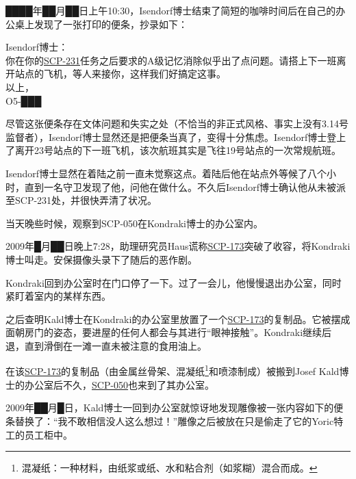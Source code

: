 

████年██月██日上午10:30，Isendorf博士结束了简短的咖啡时间后在自己的办公桌上发现了一张打印的便条，抄录如下：

\begin{scpbox}

Isendorf博士：\\
你在你的\hyperref[chap:SCP-231]{SCP-231}任务之后要求的A级记忆消除似乎出了点问题。请搭上下一班离开站点的飞机，等人来接你，这样我们好搞定这事。\\
以上，\\
O5-███

\end{scpbox}

尽管这张便条存在文体问题和失实之处（不恰当的非正式风格、事实上没有3.14号监督者），Isendorf博士显然还是把便条当真了，变得十分焦虑。Isendorf博士登上了离开23号站点的下一班飞机，该次航班其实是飞往19号站点的一次常规航班。

Isendorf博士显然在着陆之前一直未觉察这点。着陆后他在站点外等候了八个小时，直到一名守卫发现了他，问他在做什么。不久后Isendorf博士确认他从未被派至SCP-231处，并很快弄清了状况。

当天晚些时候，观察到SCP-050在Kondraki博士的办公室内。



2009年█月██日晚上7:28，助理研究员Haus谎称\hyperref[chap:SCP-173]{SCP-173}突破了收容，将Kondraki博士叫走。安保摄像头录下了随后的恶作剧。

Kondraki回到办公室时在门口停了一下。过了一会儿，他慢慢退出办公室，同时紧盯着室内的某样东西。

之后查明Kald博士在Kondraki的办公室里放置了一个\hyperref[chap:SCP-173]{SCP-173}的复制品。它被摆成面朝房门的姿态，要进屋的任何人都会与其进行“眼神接触”。Kondraki继续后退，直到滑倒在一滩一直未被注意的食用油上。

在该\hyperref[chap:SCP-173]{SCP-173}的复制品（由金属丝骨架、混凝纸\footnote{ 混凝纸：一种材料，由纸浆或纸、水和粘合剂（如浆糊）混合而成。}和喷漆制成）被搬到Josef Kald博士的办公室后不久，\hyperref[chap:SCP-050]{SCP-050}也来到了其办公室。



2009年██月█日，Kald博士一回到办公室就惊讶地发现雕像被一张内容如下的便条替换了：“我不敢相信没人这么想过！”雕像之后被放在只是偷走了它的Yoric特工的员工柜中。

